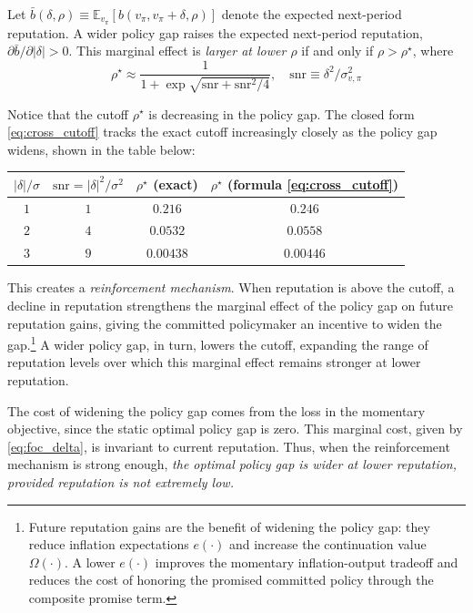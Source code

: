 \documentclass[12pt,letter,leqno]{article}
\theoremstyle{asn}
\theoremstyle{lem}
\theoremstyle{slem}
\theoremstyle{prop}
\theoremstyle{appprop}
\theoremstyle{rem}
\theoremstyle{defn}
\begin{document}
\begin{prop}\label{prop:cross_partial}
Let $\bar b(\delta,\rho)\equiv\mathbb{E}_{v_\pi}[b(v_\pi,v_\pi+\delta,\rho)]$ denote the expected next-period reputation. A wider policy gap raises the expected
next-period reputation, $\partial\bar b/\partial|\delta|>0$. This marginal effect is
\textit{larger at lower $\rho$} if and only if
$\rho>\rho^{\star}$, where
\begin{equation}
\rho^{\star}
\approx\frac{1}{1+\exp\!\sqrt{\mathrm{snr}+\mathrm{snr}^2/4}}, \quad \mathrm{snr}\equiv\delta^2/\sigma_{v,\pi}^2
\label{eq:cross_cutoff}
\end{equation}
\end{prop}

Notice that the cutoff $\rho^{\star}$ is decreasing in the policy gap. The closed form \eqref{eq:cross_cutoff} tracks the
exact cutoff increasingly closely as
the policy gap widens, shown in the table below:
\begin{center}
\begin{tabular}{cccc}
\toprule
$|\delta|/\sigma$ & $\mathrm{snr}=|\delta|^2/\sigma^2$ & $\rho^{\star}$ (exact) & $\rho^{\star}$ (formula \eqref{eq:cross_cutoff})\\
\midrule
$1$ & $1$ & $0.216$  & $0.246$\\
$2$ & $4$ & $0.0532$ & $0.0558$\\
$3$ & $9$ & $0.00438$ & $0.00446$\\
\bottomrule
\end{tabular}
\end{center}
This creates a \textit{reinforcement mechanism}. When reputation is above the cutoff, a decline in reputation strengthens the marginal effect of the policy gap on future reputation gains, giving the committed policymaker an incentive to widen the gap.\footnote{Future reputation gains are the benefit of widening the policy gap: they reduce inflation expectations $e(\cdot)$ and increase the continuation value $\Omega(\cdot)$. A lower $e(\cdot)$ improves the momentary inflation-output tradeoff and reduces the cost of honoring the promised committed policy through the composite promise term.} A wider policy gap, in turn, lowers the cutoff, expanding the range of reputation levels over which this marginal effect remains stronger at lower reputation.


The cost of widening the policy gap comes from the loss in the momentary objective, since the static optimal policy gap is zero. This marginal cost, given by \eqref{eq:foc_delta}, is invariant to current reputation. Thus, when the reinforcement mechanism is strong enough, \textit{the optimal policy gap is wider at lower reputation, provided reputation is not extremely low.} 
\end{document}
